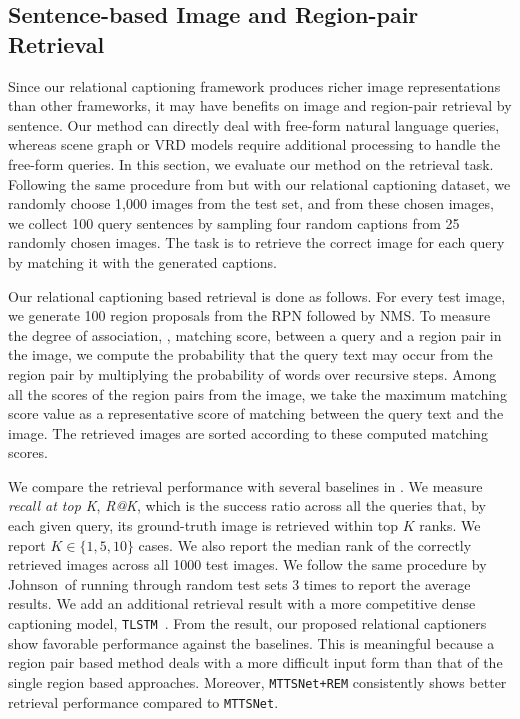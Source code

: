 \subsection{Sentence-based Image and Region-pair Retrieval}
Since our relational captioning framework produces richer image representations than other frameworks, it may have benefits on image {and}
region-pair retrieval by sentence.
{Our method can directly deal with free-form natural language queries, whereas scene graph or VRD models require additional processing to handle the free-form queries.} {In this section,} we evaluate our method on the retrieval task.
Following the same procedure 
from \cite{johnson2016densecap} but with our relational captioning dataset,
we randomly choose 1,000 images from the test set, and from these chosen images, we collect 100 query sentences by sampling four random captions from 25 randomly chosen images.
The task is to retrieve the correct image for each query by matching it with the generated captions.

{Our relational captioning based retrieval is done as follows.}
For every test image, we generate 100 region proposals from the RPN followed by NMS.
{To measure the degree of association, \ie, matching score,}
between a query and a region pair in the image, we compute the probability that the query text may occur from the region pair by multiplying the probability of words over recursive steps.
Among all the scores {of} the region pairs from the image, we take the maximum matching score value as a representative score of 
{matching between the query text and} the image.
The retrieved images are sorted {according to} these computed matching scores.











{
We compare the retrieval performance with several baselines in .
We measure \emph{recall at top K}, \emph{R@K}, which is the success ratio across all the queries that, by each given query,
its ground-truth image is retrieved within top $K$ ranks.
We report $K \in \{1,5,10\}$ cases.
}
We also report the median rank of the correctly retrieved images across all 1000 test images.
{We follow the same procedure by Johnson~\etal of running through random test sets 3 times to report the average results.
{We add an additional retrieval result with a more competitive dense captioning model, \texttt{TLSTM}~\cite{Yang_2017_CVPR}.}
From the result, our proposed relational captioners show favorable performance against the baselines.
{This is meaningful because a region pair based method deals with a more difficult input form than that of the single region based approaches.}
}
{Moreover, \texttt{MTTSNet+REM} {consistently} shows better retrieval performance compared to \texttt{MTTSNet}.}





